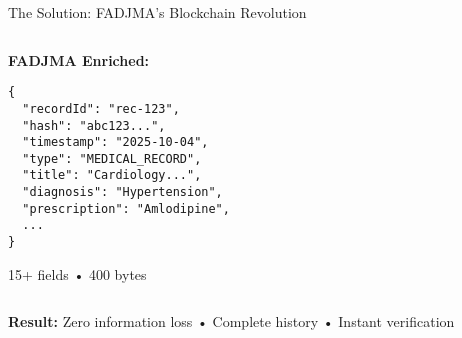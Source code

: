 \documentclass[aspectratio=169,xcolor=dvipsnames,20pt]{beamer}
\begin{document}
\begin{frame}[fragile,shrink=5]{The Solution: FADJMA's Blockchain Revolution}
\begin{columns}[T]
\begin{column}{0.5\textwidth}
      \textbf{FADJMA Enriched:}
      \begin{verbatim}
{
  "recordId": "rec-123",
  "hash": "abc123...",
  "timestamp": "2025-10-04",
  "type": "MEDICAL_RECORD",
  "title": "Cardiology...",
  "diagnosis": "Hypertension",
  "prescription": "Amlodipine",
  ...
}
      \end{verbatim}
      \textcolor{SuccessGreen}{15+ fields • 400 bytes}
    \end{column}
  \end{columns}

  \vspace{0.2cm}

  \begin{center}
    \small
    \textbf{Result:} \textcolor{SuccessGreen}{Zero information loss} • Complete history • Instant verification
  \end{center}

\end{frame}
\end{document}
